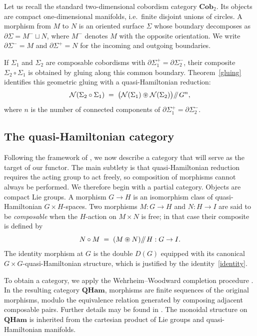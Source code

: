 \documentclass[reqno]{amsart}
\theoremstyle{plain}
\theoremstyle{definition}
\newcommand{\N}{\mathcal{N}}
\newcommand{\sll}[1]{\mkern-4mu\mathbin{/\mkern-5mu/}_{\mkern-4mu{#1}}}
\begin{document}
Let us recall the standard two-dimensional cobordism category
\(\mathbf{Cob}_2\).  Its objects are compact one-dimensional manifolds,
i.e.\ finite disjoint unions of circles.  A morphism from \(M\) to \(N\)
is an oriented surface \(\Sigma\) whose boundary decomposes as
\(\partial\Sigma = M^- \sqcup N\), where \(M^-\) denotes \(M\) with the
opposite orientation.  We write
\(\partial\Sigma^- = M\) and \(\partial\Sigma^+ = N\) for the incoming
and outgoing boundaries.

If \(\Sigma_1\) and \(\Sigma_2\) are composable cobordisms with
\(\partial\Sigma_1^+ = \partial\Sigma_2^-\), their composite
\(\Sigma_2 \circ \Sigma_1\) is obtained by gluing along this common
boundary.  Theorem~\ref{gluing} identifies this geometric gluing with a
quasi-Hamiltonian reduction:
\begin{equation}\label{66b1kwd2}
    \N(\Sigma_2 \circ \Sigma_1)
    \;=\;
    \bigl(\N(\Sigma_1) \circledast \N(\Sigma_2)\bigr)
    \sll{} G^n,
\end{equation}
where \(n\) is the number of connected components of
\(\partial\Sigma_1^+ = \partial\Sigma_2^-\).

\subsection{The quasi-Hamiltonian category}

Following the framework of \cite{mooretachikawa2012}, we now describe a
category that will serve as the target of our functor.  The main
subtlety is that quasi-Hamiltonian reduction requires the acting group
to act freely, so composition of morphisms cannot always be performed.
We therefore begin with a partial category. Objects are compact Lie groups.  A morphism \(G \to H\) is an
isomorphism class of quasi-Hamiltonian \(G \times H\)-spaces.  Two
morphisms \(M : G \to H\) and \(N : H \to I\) are said to be
\emph{composable} when the \(H\)-action on \(M \times N\) is free; in that case their composite is defined by
\[
    N \circ M
    \;=\;
    (M \circledast N) \sll{} H : G \to I.
\]
The identity morphism at \(G\) is the double \(D(G)\) equipped with its
canonical \(G \times G\)-quasi-Hamiltonian structure, which is justified by the identity~\eqref{identity}.

To obtain a category, we apply the
Wehrheim--Woodward completion procedure
\cite{wehrheim2010functoriality}.  In the resulting category
\(\mathbf{QHam}\), morphisms are finite sequences of the original morphisms, modulo the equivalence relation generated by
composing adjacent composable pairs.  Further details may be found in \cite{crooks2024moore,cazassus2019two}.  The monoidal structure on
\(\mathbf{QHam}\) is inherited from the cartesian product of Lie groups
and quasi-Hamiltonian manifolds.
\end{document}
